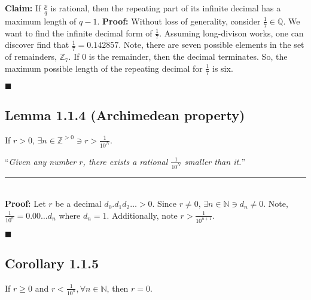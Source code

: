 \documentclass[11pt]{book}
\newcommand{\N}{\mathbb{N}}
\newcommand{\Q}{\mathbb{Q}}
\newcommand{\Z}{\mathbb{Z}}
\newcommand{\horline}{\noindent\rule{14.25cm}{0.6pt}\\}
\newcounter{lemma}
\newcommand{\QED}{\begin{flushright}$\blacksquare$\end{flushright}}
\begin{document}
		\begin{examp}
			\textbf{Claim:} If $\frac{p}{q}$ is rational, then the repeating part of its
			infinite decimal has a maximum length of $q-1$.\hfill\break
			\textbf{Proof:} Without loss of generality, consider $\frac{1}{7} \in \Q$. We want
			to find the infinite decimal form of $\frac{1}{7}$. Assuming long-divison works,
			one can discover find that $\frac{1}{7} = 0.\overline{142857}$.\hfill\break
			Note, there are seven possible elements in the set of remainders, $\Z_7$. 
			If 0 is the remainder, then the decimal terminates. So, the maximum possible length
			of the repeating decimal for $\frac{1}{7}$ is six. \QED
		\end{examp}

	\subsection{Lemma 1.1.4 (Archimedean property)}
	\label{subsec:lemma114}
		\begin{lemm}
			If $r > 0$, $\exists n \in \mathbb{Z}^{>0} \ni r > \frac{1}{10^N}$.

			``\emph{Given any number $r$, there exists a rational $\frac{1}{10^N}$ smaller than it.}''\hfill\break
			\horline
			\textbf{Proof:} Let $r$ be a decimal $d_0.d_1d_2\dots > 0$. Since $r \neq 0$,\hfill\break
			$\exists n \in \N \ni d_n \neq 0$. Note, $\frac{1}{10^n} = 0.00\dots d_n$ where\hfill\break
			$d_n = 1$. Additionally, note $r > \frac{1}{10^{n+1}}$. \QED

		\end{lemm}
	\subsection{Corollary 1.1.5}
	\label{subsec:cor115}
		\begin{cor}
			If $r \geq 0$ and $r < \frac{1}{10^n}, \forall n \in \N$, then $r = 0$.
		\end{cor}
\end{document}
